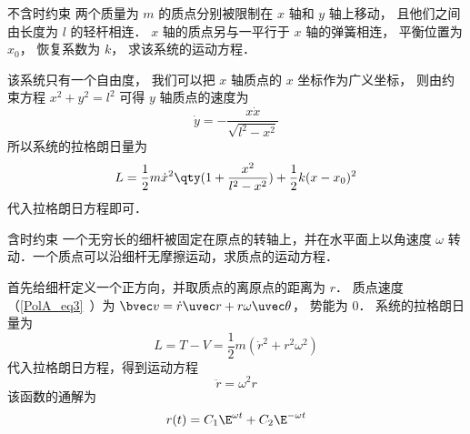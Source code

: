 \begin{example}{不含时约束}
两个质量为 $m$ 的质点分别被限制在 $x$ 轴和 $y$ 轴上移动， 且他们之间由长度为 $l$ 的轻杆相连． $x$ 轴的质点另与一平行于 $x$ 轴的弹簧相连， 平衡位置为 $x_0$， 恢复系数为 $k$， 求该系统的运动方程．%

该系统只有一个自由度， 我们可以把 $x$ 轴质点的 $x$ 坐标作为广义坐标， 则由约束方程 $x^2 + y^2 = l^2$ 可得 $y$ 轴质点的速度为
\begin{equation}
\dot y = -\frac{x\dot x}{\sqrt{l^2 - x^2}}
\end{equation}
所以系统的拉格朗日量为
\begin{equation}
L = \frac12 m \dot x^2\qty(1 + \frac{x^2}{l^2 - x^2}) + \frac12 k (x-x_0)^2
\end{equation}
代入拉格朗日方程即可．
\end{example}

\begin{example}{含时约束}
一个无穷长的细杆被固定在原点的转轴上，并在水平面上以角速度 $\omega$ 转动．一个质点可以沿细杆无摩擦运动，求质点的运动方程．

首先给细杆定义一个正方向，并取质点的离原点的距离为 $r$． 质点速度（\autoref{PolA_eq3}~）为 $\bvec v = \dot r \uvec r + r\omega \uvec\theta$， 势能为 0． 系统的拉格朗日量为
\begin{equation}
L = T - V = \frac12 m(\dot r^2 + r^2 \omega^2)
\end{equation}
代入拉格朗日方程，得到运动方程
\begin{equation}
\ddot r = \omega^2 r
\end{equation}
该函数的通解为%
\begin{equation}
r(t) = C_1 \E^{\omega t} + C_2 \E^{-\omega t}
\end{equation}
\end{example}

